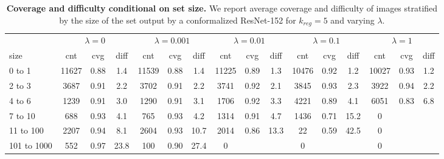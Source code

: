 \begin{table}[t]
\centering
\tiny
\begin{tabular}{lccccccccccccccc} 
\toprule
         & \multicolumn{3}{c}{$\lambda={0}$}     & \multicolumn{3}{c}{$\lambda={0.001}$}     & \multicolumn{3}{c}{$\lambda={0.01}$}     & \multicolumn{3}{c}{$\lambda={0.1}$}     & \multicolumn{3}{c}{$\lambda={1}$}    \\ 
         \cmidrule(r){2-4}     \cmidrule(r){5-7}     \cmidrule(r){8-10}     \cmidrule(r){11-13}     \cmidrule(r){14-16}    
size &cnt & cvg & diff    &cnt & cvg & diff    &cnt & cvg & diff    &cnt & cvg & diff    &cnt & cvg & diff    \\ 
\midrule 
0 to 1      & 11627 & 0.88 & 1.4   & 11539 & 0.88 & 1.4   & 11225 & 0.89 & 1.3   & 10476 & 0.92 & 1.2   & 10027 & 0.93 & 1.2  \\ 
2 to 3      & 3687 & 0.91 & 2.2   & 3702 & 0.91 & 2.2   & 3741 & 0.92 & 2.1   & 3845 & 0.93 & 2.3   & 3922 & 0.94 & 2.2  \\ 
4 to 6      & 1239 & 0.91 & 3.0   & 1290 & 0.91 & 3.1   & 1706 & 0.92 & 3.3   & 4221 & 0.89 & 4.1   & 6051 & 0.83 & 6.8  \\ 
7 to 10      & 688 & 0.93 & 4.1   & 765 & 0.93 & 4.2   & 1314 & 0.91 & 4.7   & 1436 & 0.71 & 15.2   & 0 & & \\ 
11 to 100      & 2207 & 0.94 & 8.1   & 2604 & 0.93 & 10.7   & 2014 & 0.86 & 13.3   & 22 & 0.59 & 42.5   & 0 & & \\ 
101 to 1000      & 552 & 0.97 & 23.8   & 100 & 0.90 & 27.4   & 0 & &  & 0 & &  & 0 & & \\ 
\bottomrule
\end{tabular}
\caption{\textbf{Coverage and difficulty conditional on set size.} We report average coverage and difficulty of images stratified by the size of the set output by a conformalized ResNet-152 for $k_{reg}=5$ and varying $\lambda$.}
\label{table:adaptiveness}
\end{table}
